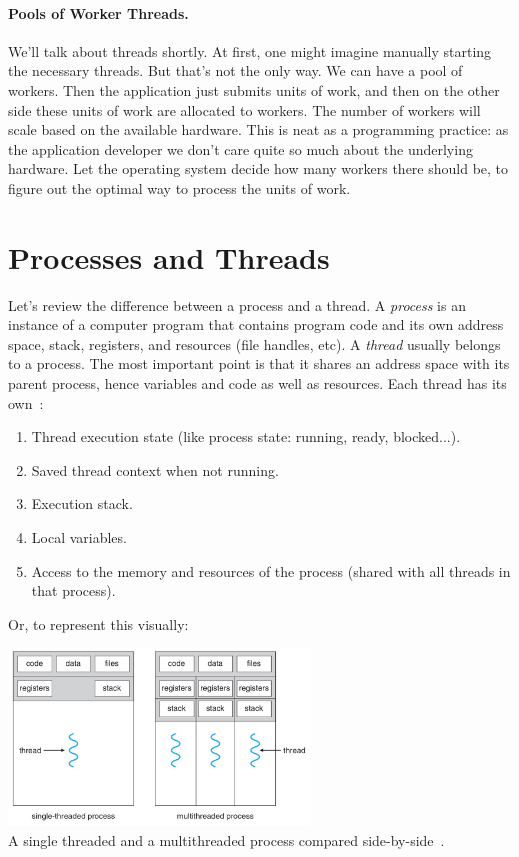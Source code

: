 \paragraph{Pools of Worker Threads.}
We'll talk about threads shortly. At first, one might imagine manually starting the necessary threads. But that's not the only way. We can have a pool of workers. Then the application just submits units of work, and then on the other side these units of work are allocated to workers. The number of workers will scale based on the available hardware. This is neat as a programming practice: as the application developer we don't care quite so much about the underlying hardware. Let the operating system decide how many workers there should be, to figure out the optimal way to process the units of work.

\section*{Processes and Threads} Let's review the
difference between a process and a thread. A \emph{process} is an
instance of a computer program that contains program code and its own
address space, stack, registers, and resources (file handles, etc).  A
\emph{thread} usually belongs to a process. The most important point
is that it shares an address space with its parent process, hence
variables and code as well as resources. Each thread has its own~\cite{osi}:
\begin{enumerate}
	\item Thread execution state (like process state: running, ready, blocked...).
	\item Saved thread context when not running.
	\item Execution stack.
	\item Local variables.
	\item Access to the memory and resources of the process (shared with all threads in that process).
\end{enumerate}

Or, to represent this visually:

\begin{center}
	\includegraphics[width=0.6\textwidth]{images/mthread2.png}\\
	A single threaded and a multithreaded process compared side-by-side~\cite{osc}.
\end{center}

